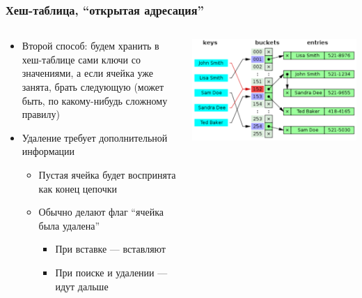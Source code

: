 \documentclass[xetex,mathserif,serif]{beamer}
\begin{document}
	\begin{frame}
		\frametitle{Хеш-таблица, ``открытая адресация''}
		\begin{columns}
			\begin{column}{0.6\textwidth}
				\begin{itemize}
					\item Второй способ: будем хранить в хеш-таблице сами ключи со значениями, а если ячейка уже занята, брать следующую (может быть, по какому-нибудь сложному правилу)
					\item Удаление требует дополнительной информации
					\begin{itemize}
						\item Пустая ячейка будет воспринята как конец цепочки
						\item Обычно делают флаг ``ячейка была удалена''
						\begin{itemize}
							\item При вставке --- вставляют
							\item При поиске и удалении --- идут дальше
						\end{itemize}
					\end{itemize}
				\end{itemize}
			\end{column}
			\begin{column}{0.4\textwidth}
				\begin{center}
					\includegraphics[width=\textwidth]{hashOnLists.png}
				\end{center}
			\end{column}
		\end{columns}
	\end{frame}
\end{document}
